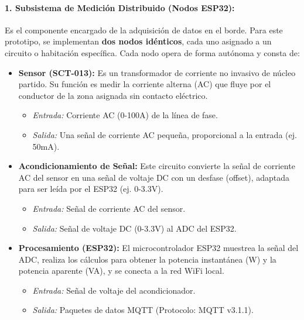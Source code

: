         \paragraph{1. Subsistema de Medición Distribuido (Nodos ESP32):}
        Es el componente encargado de la adquisición de datos en el borde. Para este prototipo, se implementan \textbf{dos nodos idénticos}, cada uno asignado a un circuito o habitación específica. Cada nodo opera de forma autónoma y consta de:
        \begin{itemize}
            \item \textbf{Sensor (SCT-013):} Es un transformador de corriente no invasivo de núcleo partido.
            Su función es medir la corriente alterna (AC) que fluye por el conductor de la zona asignada sin contacto eléctrico.
            \begin{itemize}
                    \item \textit{Entrada:} Corriente AC (0-100A) de la línea de fase.
                    \item \textit{Salida:} Una señal de corriente AC pequeña, proporcional a la entrada (ej. 50mA).
            \end{itemize}
            \item \textbf{Acondicionamiento de Señal:} Este circuito convierte la señal de corriente AC del sensor en una señal de voltaje DC con un desfase (offset), adaptada para ser leída por el ESP32 (ej. 0-3.3V).
            \begin{itemize}
                    \item \textit{Entrada:} Señal de corriente AC del sensor.
                    \item \textit{Salida:} Señal de voltaje DC (0-3.3V) al ADC del ESP32.
            \end{itemize}
            \item \textbf{Procesamiento (ESP32):} El microcontrolador ESP32 muestrea la señal del ADC, realiza los cálculos para obtener la potencia instantánea (W) y la potencia aparente (VA), y se conecta a la red WiFi local.
            \begin{itemize}
                    \item \textit{Entrada:} Señal de voltaje del acondicionador.
                    \item \textit{Salida:} Paquetes de datos MQTT (Protocolo: MQTT v3.1.1).
                \end{itemize}
        \end{itemize}

